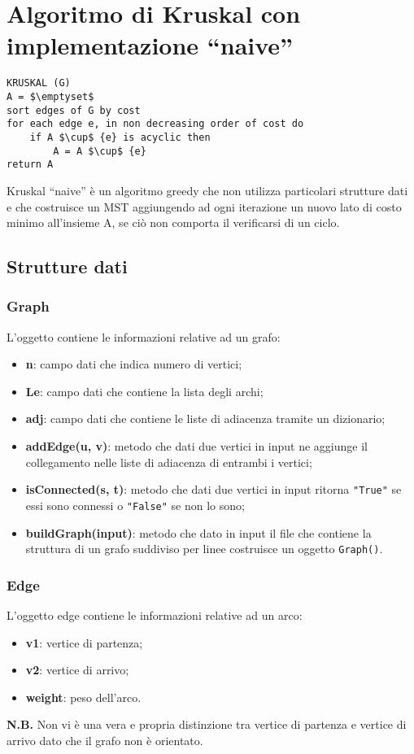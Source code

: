 \section{Algoritmo di Kruskal con implementazione ``naive''}\label{kruskal_naive}
\begin{lstlisting}[mathescape=true]
KRUSKAL (G)
A = $\emptyset$
sort edges of G by cost
for each edge e, in non decreasing order of cost do
	if A $\cup$ {e} is acyclic then
		A = A $\cup$ {e}
return A	
\end{lstlisting}
Kruskal ``naive'' è un algoritmo greedy che non utilizza particolari strutture dati e che costruisce un MST aggiungendo ad ogni iterazione un nuovo lato di costo minimo all'insieme A, se ciò non comporta il verificarsi di un ciclo.
\subsection{Strutture dati}
\subsubsection{Graph}\label{kruskal_naive_graph}
L'oggetto contiene le informazioni relative ad un grafo:
\begin{itemize}
	\item \textbf{n}: campo dati che indica numero di vertici;
	\item \textbf{Le}: campo dati che contiene la lista degli archi;
	\item \textbf{adj}: campo dati che contiene le liste di adiacenza tramite un dizionario;
	\item \textbf{addEdge(u, v)}: metodo che dati due vertici in input ne aggiunge il collegamento nelle liste di adiacenza di entrambi i vertici;
	\item \textbf{isConnected(s, t)}: metodo che dati due vertici in input ritorna \texttt{"True"} se essi sono connessi o \texttt{"False"} se non lo sono;
	\item \textbf{buildGraph(input)}: metodo che dato in input il file che contiene la struttura di un grafo suddiviso per linee costruisce un oggetto \texttt{Graph()}.
\end{itemize} 
\subsubsection{Edge}\label{kruskal_naive_edge}
L'oggetto edge contiene le informazioni relative ad un arco:
\begin{itemize}
	\item \textbf{v1}: vertice di partenza;
	\item \textbf{v2}: vertice di arrivo;
	\item \textbf{weight}: peso dell'arco.
\end{itemize}
\textbf{N.B.} Non vi è una vera e propria distinzione tra vertice di partenza e vertice di arrivo dato che il grafo non è orientato.

